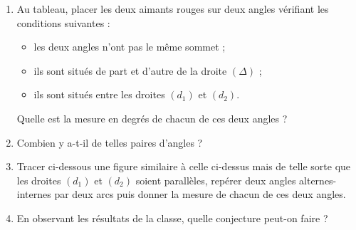 \begin{activite}
{   \begin{enumerate}
      \item Au tableau, placer les deux aimants rouges sur deux angles vérifiant les conditions suivantes :
         \begin{itemize}
            \item les deux angles n'ont pas le même sommet ;
            \item ils sont situés de part et d'autre de la droite $(\Delta)$ ;
            \item ils sont situés \og entre \fg{} les droites $(d_1)$ et $(d_2)$.
         \end{itemize}
      Quelle est la mesure en degrés de chacun de ces deux angles ?
      \par\pointilles[\linewidth]
      \par\pointilles[\linewidth]               
      \item Combien y a-t-il de telles paires d'angles ?
      \par\pointilles[\linewidth]
      \begin{center}
      \end{center}
      \item Tracer ci-dessous une figure similaire à celle ci-dessus mais de telle sorte que les droites $(d_1)$ et $(d_2)$ soient parallèles, repérer deux angles alternes-internes par deux arcs puis donner la mesure de chacun de ces deux angles.
      \par\vspace*{30mm}
      \item En observant les résultats de la classe, quelle conjecture peut-on faire ?
      

\end{enumerate}}
\end{activite}
